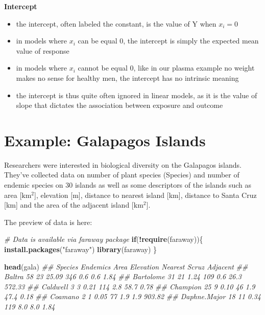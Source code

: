\documentclass[
]{book}
\newenvironment{Shaded}{\begin{snugshade}}{\end{snugshade}}
\newcommand{\CommentTok}[1]{\textcolor[rgb]{0.56,0.35,0.01}{\textit{#1}}}
\newcommand{\ControlFlowTok}[1]{\textcolor[rgb]{0.13,0.29,0.53}{\textbf{#1}}}
\newcommand{\KeywordTok}[1]{\textcolor[rgb]{0.13,0.29,0.53}{\textbf{#1}}}
\newcommand{\NormalTok}[1]{#1}
\newcommand{\OperatorTok}[1]{\textcolor[rgb]{0.81,0.36,0.00}{\textbf{#1}}}
\newcommand{\StringTok}[1]{\textcolor[rgb]{0.31,0.60,0.02}{#1}}
\providecommand{\tightlist}{%
  \setlength{\itemsep}{0pt}\setlength{\parskip}{0pt}}
\theoremstyle{definition}
\theoremstyle{definition}
\theoremstyle{definition}
\theoremstyle{remark}
\begin{document}
\textbf{Intercept}

\begin{itemize}
\tightlist
\item
  the intercept, often labeled the constant, is the value of Y when \(x_i=0\)
\item
  in models where \(x_i\) can be equal 0, the intercept is simply the expected mean value of response
\item
  in models where \(x_i\) cannot be equal 0, like in our plasma example no weight makes no sense for healthy men, the intercept has no intrinsic meaning
\item
  the intercept is thus quite often ignored in linear models, as it is the value of slope that dictates the association between exposure and outcome
\end{itemize}

\hypertarget{example-galapagos-islands}{%
\section{Example: Galapagos Islands}\label{example-galapagos-islands}}

Researchers were interested in biological diversity on the Galapagos islands. They've collected data on number of plant species (Species) and number of endemic species on 30 islands as well as some descriptors of the islands such as area {[}\(\mathrm{km^2}\){]}, elevation {[}m{]}, distance to nearest island {[}km{]}, distance to Santa Cruz {[}km{]} and the area of the adjacent island {[}\(\mathrm{km^2}\){]}.

The preview of data is here:

\begin{Shaded}
\begin{Highlighting}[]
\CommentTok{\# Data is available via faraway package}
\ControlFlowTok{if}\NormalTok{(}\OperatorTok{!}\KeywordTok{require}\NormalTok{(faraway))\{}
    \KeywordTok{install.packages}\NormalTok{(}\StringTok{"faraway"}\NormalTok{)}
    \KeywordTok{library}\NormalTok{(faraway)}
\NormalTok{\}}

\KeywordTok{head}\NormalTok{(gala)}
\CommentTok{\#\#              Species Endemics  Area Elevation Nearest Scruz Adjacent}
\CommentTok{\#\# Baltra            58       23 25.09       346     0.6   0.6     1.84}
\CommentTok{\#\# Bartolome         31       21  1.24       109     0.6  26.3   572.33}
\CommentTok{\#\# Caldwell           3        3  0.21       114     2.8  58.7     0.78}
\CommentTok{\#\# Champion          25        9  0.10        46     1.9  47.4     0.18}
\CommentTok{\#\# Coamano            2        1  0.05        77     1.9   1.9   903.82}
\CommentTok{\#\# Daphne.Major      18       11  0.34       119     8.0   8.0     1.84}
\end{Highlighting}
\end{Shaded}
\end{document}
